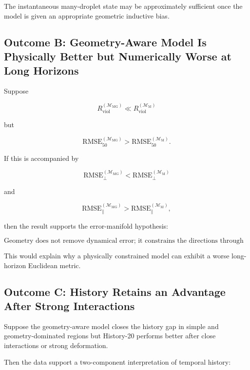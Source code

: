 \documentclass[11pt]{article}
\newcommand{\Mmark}{\mathcal{M}_{\mathrm{M}}}
\newcommand{\Mgeom}{\mathcal{M}_{\mathrm{MG}}}
\begin{document}
The instantaneous many-droplet state may be approximately sufficient once the model is given an appropriate geometric inductive bias.

\subsection{Outcome B: Geometry-Aware Model Is Physically Better but Numerically Worse at Long Horizons}

Suppose

\begin{equation}
R_{\mathrm{viol}}^{(\Mgeom)}
\ll
R_{\mathrm{viol}}^{(\Mmark)}
\end{equation}

but

\begin{equation}
\mathrm{RMSE}_{50}^{(\Mgeom)}
>
\mathrm{RMSE}_{50}^{(\Mmark)}.
\end{equation}

If this is accompanied by

\begin{equation}
\mathrm{RMSE}_{\perp}^{(\Mgeom)}
<
\mathrm{RMSE}_{\perp}^{(\Mmark)}
\end{equation}

and

\begin{equation}
\mathrm{RMSE}_{\parallel}^{(\Mgeom)}
>
\mathrm{RMSE}_{\parallel}^{(\Mmark)},
\end{equation}

then the result supports the error-manifold hypothesis:

\begin{equation}
\boxed{
\text{Geometry does not remove dynamical error; it constrains the directions through which error can propagate.}
}
\end{equation}

This would explain why a physically constrained model can exhibit a worse long-horizon Euclidean metric.

\subsection{Outcome C: History Retains an Advantage After Strong Interactions}

Suppose the geometry-aware model closes the history gap in simple and geometry-dominated regions but History-20 performs better after close interactions or strong deformation.

Then the data support a two-component interpretation of temporal history:
\end{document}
